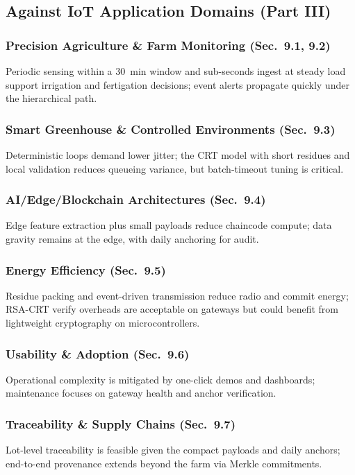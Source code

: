 \subsection{Against IoT Application Domains (Part III)}
\subsubsection{Precision Agriculture \& Farm Monitoring (Sec.~9.1, 9.2)}
Periodic sensing within a 30~min window and sub-seconds ingest at steady load support irrigation and fertigation decisions; event alerts propagate quickly under the hierarchical path.

\subsubsection{Smart Greenhouse \& Controlled Environments (Sec.~9.3)}
Deterministic loops demand lower jitter; the CRT model with short residues and local validation reduces queueing variance, but batch-timeout tuning is critical.

\subsubsection{AI/Edge/Blockchain Architectures (Sec.~9.4)}
Edge feature extraction plus small payloads reduce chaincode compute; data gravity remains at the edge, with daily anchoring for audit.

\subsubsection{Energy Efficiency (Sec.~9.5)}
Residue packing and event-driven transmission reduce radio and commit energy; RSA-CRT verify overheads are acceptable on gateways but could benefit from lightweight cryptography on microcontrollers.

\subsubsection{Usability \& Adoption (Sec.~9.6)}
Operational complexity is mitigated by one-click demos and dashboards; maintenance focuses on gateway health and anchor verification.

\subsubsection{Traceability \& Supply Chains (Sec.~9.7)}
Lot-level traceability is feasible given the compact payloads and daily anchors; end-to-end provenance extends beyond the farm via Merkle commitments.

